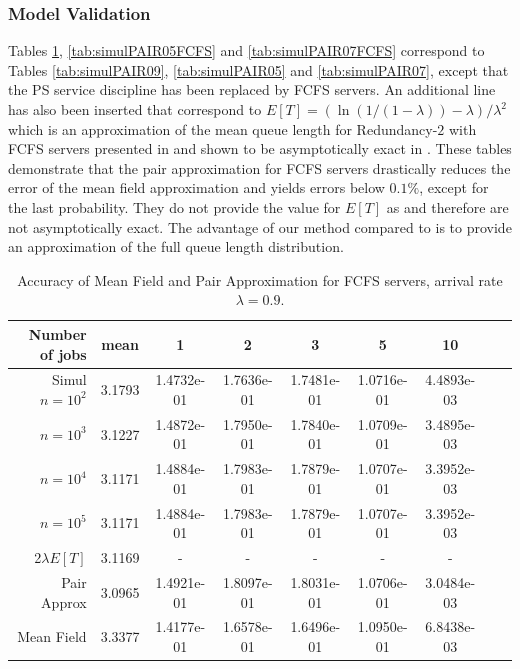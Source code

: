 \documentclass[acmsmall,nonacm]{acmart}
\newcommand\red[1]{{#1}}
\begin{document}
\subsubsection{Model Validation}

Tables \ref{tab:simulPAIR09FCFS}, \ref{tab:simulPAIR05FCFS} and \ref{tab:simulPAIR07FCFS} correspond to
Tables \ref{tab:simulPAIR09}, \ref{tab:simulPAIR05} and \ref{tab:simulPAIR07}, except that the PS service
discipline has been replaced by FCFS servers. \red{An additional line has also
been inserted that correspond to $E[T] = (\ln (1/(1-\lambda)) - \lambda)/\lambda^2$ which is an approximation of the mean queue length for Redundancy-$2$ with FCFS servers presented in \cite{gardner2017redundancy} and shown to be asymptotically exact in \cite{shneer2020large}.}
These tables demonstrate that the pair approximation
for FCFS servers drastically reduces the error of the mean field approximation and yields errors
below $0.1\%$, except for the last probability. They do not provide the value for $E[T]$ as \cite{gardner2017redundancy} and therefore are not asymptotically exact. The advantage of our method compared to \cite{gardner2017redundancy} is to provide an approximation of the full queue length distribution.

\begin{table}[t]
    \centering
    \begin{tabular}{|r|c|c|c|c|c|c|c|c|}
    \hline 
        Number of jobs & mean & 1 & 2 & 3 & 5 & 10\\ \hline
         \hline
         Simul $n=10^2$&    3.1793 &  1.4732e-01&   1.7636e-01 &  1.7481e-01 &  1.0716e-01   &4.4893e-03\\
 $n=10^3$&  3.1227   &1.4872e-01 &  1.7950e-01  & 1.7840e-01 &  1.0709e-01  & 3.4895e-03\\
    $n=10^4$&3.1171   &1.4884e-01 &  1.7983e-01  & 1.7879e-01 &  1.0707e-01  & 3.3952e-03\\
   $n=10^5$& 3.1171   &1.4884e-01 &  1.7983e-01  & 1.7879e-01 &  1.0707e-01  & 3.3952e-03\\\hline
  \red{2$\lambda E[T]$ \cite{gardner2017redundancy}}&  \red{3.1169}   & - &  -  & -&  -  & - \\ \hline
   Pair Approx & 3.0965   &1.4921e-01 &  1.8097e-01  & 1.8031e-01 &  1.0706e-01  & 3.0484e-03\\\hline
  Mean Field &  3.3377   &1.4177e-01 &  1.6578e-01  & 1.6496e-01 &  1.0950e-01  & 6.8438e-03\\
         \hline
    \end{tabular}
    \caption{Accuracy of Mean Field and Pair Approximation for FCFS servers, arrival rate $\lambda=0.9$. }
    \label{tab:simulPAIR09FCFS}
\end{table}
\end{document}
